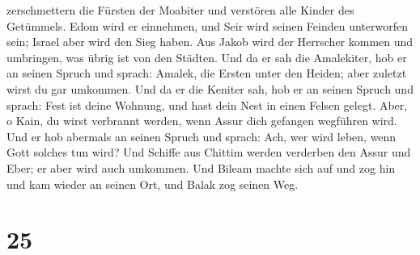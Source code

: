 zerschmettern die Fürsten der Moabiter und verstören alle Kinder des
Getümmels.  Edom wird er einnehmen, und Seir wird seinen
Feinden unterworfen sein; Israel aber wird den Sieg haben. 
Aus Jakob wird der Herrscher kommen und umbringen, was übrig ist von den
Städten.  Und da er sah die Amalekiter, hob er an seinen
Spruch und sprach: Amalek, die Ersten unter den Heiden; aber zuletzt
wirst du gar umkommen.  Und da er die Keniter sah, hob er
an seinen Spruch und sprach: Fest ist deine Wohnung, und hast dein Nest
in einen Felsen gelegt.  Aber, o Kain, du wirst verbrannt
werden, wenn Assur dich gefangen wegführen wird.  Und er
hob abermals an seinen Spruch und sprach: Ach, wer wird leben, wenn Gott
solches tun wird?  Und Schiffe aus Chittim werden verderben
den Assur und Eber; er aber wird auch umkommen.  Und Bileam
machte sich auf und zog hin und kam wieder an seinen Ort, und Balak zog
seinen Weg.

\hypertarget{section-24}{%
\section{25}\label{section-24}}

